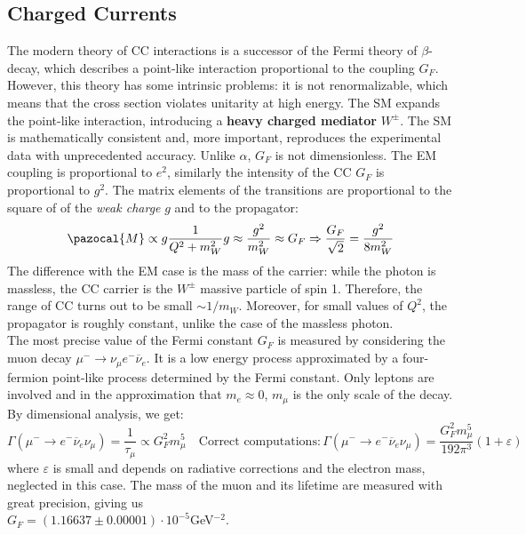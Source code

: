 \documentclass[10.75pt,a4paper,openright,bottom=2cm]{article}
\begin{document}
\subsection{Charged Currents}
The modern theory of CC interactions is a successor of the Fermi theory of $\beta$-decay, which describes a point-like interaction proportional to the coupling $G_F$. However, this theory has some intrinsic problems: it is not renormalizable, which means that the cross section violates unitarity at high energy. The SM expands the point-like interaction, introducing a \textbf{heavy charged mediator} $W^\pm$. The SM is mathematically consistent and, more important, reproduces the experimental data with unprecedented accuracy. Unlike $\alpha$, $G_F$ is not dimensionless. The EM coupling is proportional to $e^2$, similarly the intensity of the CC $G_F$ is proportional to $g^2$. The matrix elements of the transitions are proportional to the square of of the \textit{weak charge} $g$ and to the propagator:
\[
\pazocal{M}\propto g\frac{1}{Q^2+m_W^2}g\approx\frac{g^2}{m_W^2}\approx G_F\Rightarrow\frac{G_F}{\sqrt{2}}=\frac{g^2}{8m_W^2}
\]
The difference with the EM case is the mass of the carrier: while the photon is massless, the CC carrier is the $W^\pm$ massive particle of spin 1. Therefore, the range of CC turns out to be small $\sim1/m_W$. Moreover, for small values of $Q^2$, the propagator is roughly constant, unlike the case of the massless photon.\\
The most precise value of the Fermi constant $G_F$ is measured by considering the muon decay $\mu^-\to\nu_\mu e^-\overline{\nu}_e$. It is a low energy process approximated by a four-fermion point-like process determined by the Fermi constant. Only leptons are involved and in the approximation that $m_e\approx0$, $m_\mu$ is the only scale of the decay. By dimensional analysis, we get:
\[
\Gamma(\mu^-\to e^-\overline{\nu}_e\nu_\mu)=\frac{1}{\tau_\mu}\propto G_F^2m_\mu^5 \quad \text{Correct computations:}\,\Gamma(\mu^-\to e^-\overline{\nu}_e\nu_\mu)=\frac{G_F^2m_\mu^5}{192\pi^3}(1+\varepsilon)
\]
where $\varepsilon$ is small and depends on radiative corrections and the electron mass, neglected in this case. The mass of the muon and its lifetime are measured with great precision, giving us\\
$G_F=(1.16637\pm0.00001)\cdot10^{-5}$\;GeV$^{-2}$.
\end{document}
